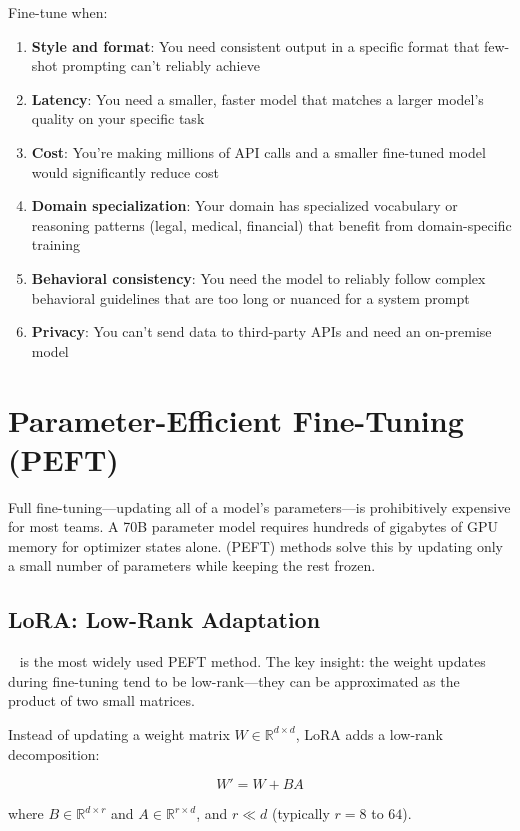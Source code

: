 Fine-tune when:

\begin{enumerate}[leftmargin=*]
    \item \textbf{Style and format}: You need consistent output in a specific format that few-shot prompting can't reliably achieve
    \item \textbf{Latency}: You need a smaller, faster model that matches a larger model's quality on your specific task
    \item \textbf{Cost}: You're making millions of API calls and a smaller fine-tuned model would significantly reduce cost
    \item \textbf{Domain specialization}: Your domain has specialized vocabulary or reasoning patterns (legal, medical, financial) that benefit from domain-specific training
    \item \textbf{Behavioral consistency}: You need the model to reliably follow complex behavioral guidelines that are too long or nuanced for a system prompt
    \item \textbf{Privacy}: You can't send data to third-party APIs and need an on-premise model
\end{enumerate}

\section{Parameter-Efficient Fine-Tuning (PEFT)}

Full fine-tuning---updating all of a model's parameters---is prohibitively expensive for most teams. A 70B parameter model requires hundreds of gigabytes of GPU memory for optimizer states alone.  (PEFT) methods solve this by updating only a small number of parameters while keeping the rest frozen.

\subsection{LoRA: Low-Rank Adaptation}

~\cite{hu2022lora} is the most widely used PEFT method. The key insight: the weight updates during fine-tuning tend to be low-rank---they can be approximated as the product of two small matrices.

Instead of updating a weight matrix $W \in \mathbb{R}^{d \times d}$, LoRA adds a low-rank decomposition:

$$W' = W + BA$$

where $B \in \mathbb{R}^{d \times r}$ and $A \in \mathbb{R}^{r \times d}$, and $r \ll d$ (typically $r = 8$ to $64$).


